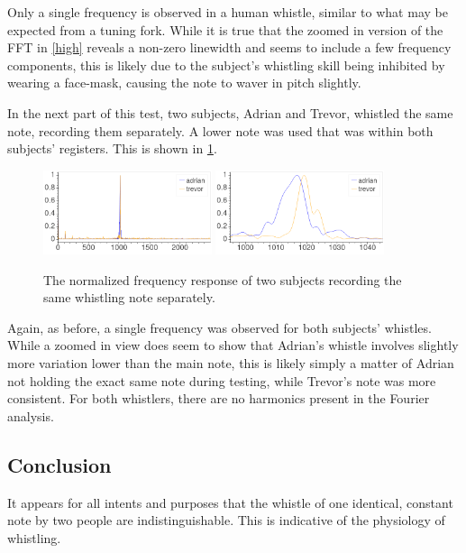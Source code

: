\documentclass[aps,prl,reprint]{revtex4-2}
\begin{document}
Only a single frequency is observed in a human whistle, similar to what may
be expected from a tuning fork. While it is true that the zoomed in version
of the FFT in \ref{high} reveals a non-zero linewidth and seems to include a few
frequency components, this is likely due to the subject's whistling skill
being inhibited by wearing a face-mask, causing the note to waver in pitch 
slightly. \\

\newpage

In the next part of this test, two subjects, Adrian and Trevor,
whistled the same note, recording
them separately. A lower note was used that was within both subjects' registers.
This is shown in \ref{low}.

\begin{figure}[h]
\includegraphics[width=0.44\textwidth]{../Images/l5_D_2.png}
\includegraphics[width=0.44\textwidth]{../Images/l5_D_2_zoomed.png}
\caption{\label{low} The normalized frequency response of
two subjects recording the same whistling note separately.}
\end{figure}

Again, as before, a single frequency was observed for both subjects' 
whistles. While a zoomed in view does seem to show that Adrian's whistle
involves slightly more variation lower than the main note, this is likely
simply a matter of Adrian not holding the exact same note during testing,
while Trevor's note was more consistent. For both whistlers, there are 
no harmonics present in the Fourier analysis. 

\subsection{Conclusion}

It appears for all intents and purposes that the whistle of one identical,
constant note by two people are indistinguishable. This is indicative
of the physiology of whistling. \\
\end{document}
